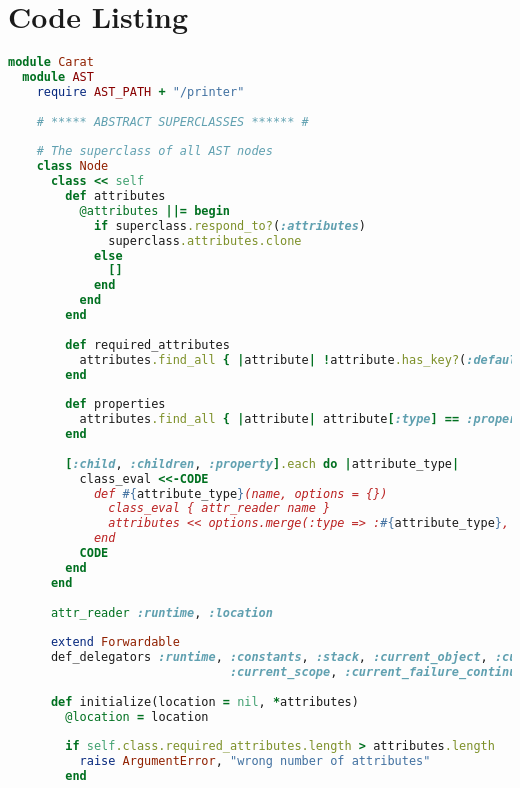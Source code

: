 

\section{Code Listing}
\begin{lstlisting}[title={\small\ttfamily\bfseries ast/ast.rb},language=Ruby]
module Carat
  module AST
    require AST_PATH + "/printer"
    
    # ***** ABSTRACT SUPERCLASSES ****** #
    
    # The superclass of all AST nodes
    class Node
      class << self
        def attributes
          @attributes ||= begin
            if superclass.respond_to?(:attributes)
              superclass.attributes.clone
            else
              []
            end
          end
        end
        
        def required_attributes
          attributes.find_all { |attribute| !attribute.has_key?(:default) }
        end
        
        def properties
          attributes.find_all { |attribute| attribute[:type] == :property }
        end
        
        [:child, :children, :property].each do |attribute_type|
          class_eval <<-CODE
            def #{attribute_type}(name, options = {})
              class_eval { attr_reader name }
              attributes << options.merge(:type => :#{attribute_type}, :name => name)
            end
          CODE
        end
      end
      
      attr_reader :runtime, :location
      
      extend Forwardable
      def_delegators :runtime, :constants, :stack, :current_object, :current_location,
                               :current_scope, :current_failure_continuation
      
      def initialize(location = nil, *attributes)
        @location = location
        
        if self.class.required_attributes.length > attributes.length
          raise ArgumentError, "wrong number of attributes"
        end
        

\end{lstlisting}

